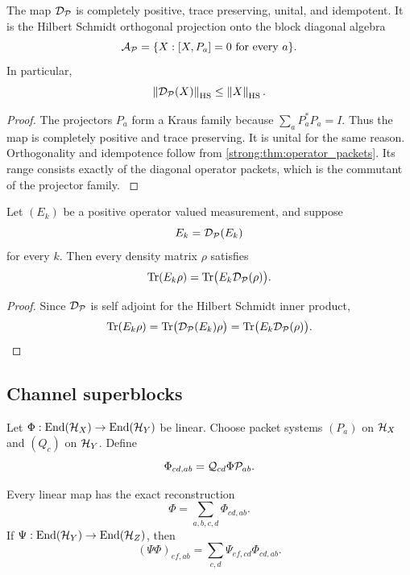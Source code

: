 \begin{theorem}\label{strong:theorem:020}\label{strong:thm:dephasing_expectation}
The map \(\Dcal_{\Pcal}\) is completely positive, trace preserving, unital, and idempotent. It is the Hilbert Schmidt orthogonal projection onto the block diagonal algebra
\[
\Acal_{\Pcal}
=
\{X:[X,P_a]=0\text{ for every }a\}.
\]
In particular,
\[
\norm{\Dcal_{\Pcal}(X)}_{\HS}
\leq
\norm{X}_{\HS}.
\]
\end{theorem}

\begin{proof}\label{strong:proof:030}
The projectors \(P_a\) form a Kraus family because \(\sum_aP_a^*P_a=I\). Thus the map is completely positive and trace preserving. It is unital for the same reason. Orthogonality and idempotence follow from \cref{strong:thm:operator_packets}. Its range consists exactly of the diagonal operator packets, which is the commutant of the projector family.
\label{strong:proof:030:end}\end{proof}

\begin{corollary}\label{strong:corollary:008}\label{strong:cor:measurement_invariance}
Let \((E_k)\) be a positive operator valued measurement, and suppose
\[
E_k=\Dcal_{\Pcal}(E_k)
\]
for every \(k\). Then every density matrix \(\rho\) satisfies
\[
\Tr(E_k\rho)
=
\Tr\bigl(E_k\Dcal_{\Pcal}(\rho)\bigr).
\]
\end{corollary}

\begin{proof}\label{strong:proof:031}
Since \(\Dcal_{\Pcal}\) is self adjoint for the Hilbert Schmidt inner product,
\[
\Tr(E_k\rho)
=
\Tr\bigl(\Dcal_{\Pcal}(E_k)\rho\bigr)
=
\Tr\bigl(E_k\Dcal_{\Pcal}(\rho)\bigr).
\]
\label{strong:proof:031:end}\end{proof}

\subsection{Channel superblocks}\label{strong:subsec:channel_blocks}

Let \(\Phi:\End(\Hcal_X)\to\End(\Hcal_Y)\) be linear. Choose packet systems \((P_a)\) on \(\Hcal_X\) and \((Q_c)\) on \(\Hcal_Y\). Define
\[
\Phi_{cd,ab}
=
\Qcal_{cd}\Phi\Pcal_{ab}.
\]

\begin{theorem}\label{strong:theorem:021}\label{strong:thm:channel_blocks}
Every linear map has the exact reconstruction
\[
\Phi=\sum_{a,b,c,d}\Phi_{cd,ab}.
\]
If \(\Psi:\End(\Hcal_Y)\to\End(\Hcal_Z)\), then
\[
(\Psi\Phi)_{ef,ab}
=
\sum_{c,d}
\Psi_{ef,cd}\Phi_{cd,ab}.
\]
\end{theorem}

